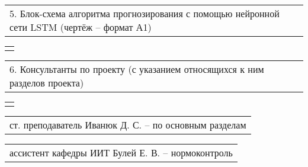 \documentclass[12pt, А4, twoside]{article}
\begin{document}
\begin{FlushLeft}
    \vspace{-0.1 cm}

    \begin{tabular}{p{17.25cm}}
        \hspace{0.3cm} \textsf{5. Блок-схема алгоритма прогнозирования с помощью нейронной сети LSTM (чертёж {--} формат А1)} \vspace{0pt} \hline  \\
    \end{tabular}

    \begin{tabular}{p{17.25cm}}
        \vspace{0pt} \hline  \\
    \end{tabular}

    \vspace{-0.1 cm}

    \begin{tabular}{p{17.25cm}}
        \textsf{6. Консультанты по проекту (с указанием относящихся к ним разделов проекта)} \vspace{0pt} \hline \\
    \end{tabular}

    \begin{tabular}{p{17.25cm}}
        \vspace{0pt} \hline \\
    \end{tabular}

    \vspace{-0.1 cm}

    \begin{tabular}{p{17.25cm}}
        \hspace{0.3cm} \textsf{ст. преподаватель Иванюк Д. С.} \hspace{4.065cm} \textsf{{--} по основным разделам} \vspace{0pt} \hline \\
    \end{tabular}

    \vspace{-0.1 cm}

    \begin{tabular}{p{17.25cm}}
        \hspace{0.3cm} \textsf{ассистент кафедры ИИТ Булей Е. В.} \hspace{3.3325cm} \textsf{{--} нормоконтроль} \vspace{0pt} \hline \\
    \end{tabular}


\end{FlushLeft}
\end{document}
